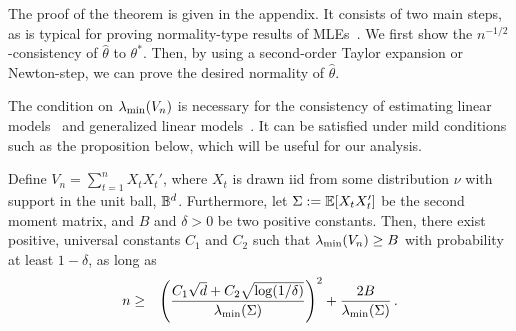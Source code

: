 The proof of the theorem is given in the appendix.  It consists of two main steps, as is typical for proving normality-type results of MLEs~\citep{van2000asymptotic}.  We first show the $n^{-1/2}$-consistency of $\hat{\theta}$ to $\theta^*$. Then, by using a second-order Taylor expansion or Newton-step, we can prove the desired normality of $\hat{\theta}$.

The condition  on $\lambda_{\min}(V_n)$ is necessary for the consistency of estimating linear models~\cite{lai1982least,bickel2009simultaneous} and generalized linear models~\cite{fahrmeir1985consistency,chen1999strong}. It can be satisfied under mild conditions
such as the proposition below, which will be useful for our analysis.

\begin{proposition}
\label{pro:spectral}
Define $V_n=\sum_{t=1}^n X_t X_t'$, where $X_t$ is drawn iid from some distribution $\nu$ with support in the unit ball, $\mathbb{B}^d$.  Furthermore, let $\Sigma:=\mathbb{E}[X_tX_t']$ be the second moment matrix, and $B$ and $\delta>0$ be two positive constants.  Then, there exist positive, universal constants $C_1$ and $C_2$ such that $\lambda_{\min}(V_n) \ge B$ with probability at least $1-\delta$, as long as
\begin{eqnarray*}
n &\ge& \left(\frac{C_1 \sqrt{d} + C_2 \sqrt{\log(1/\delta)}}{\lambda_{\min}(\Sigma)}\right)^2 + \frac{2B}{\lambda_{\min}(\Sigma)}\,.
\end{eqnarray*}
\end{proposition}

